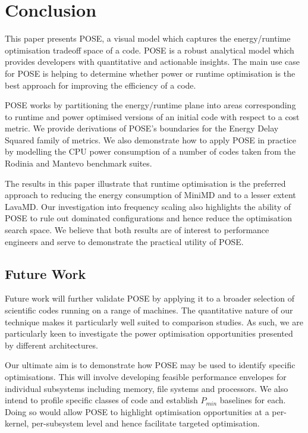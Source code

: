 \section{Conclusion}
\label{sec:conclusion}
This paper presents POSE, a visual model which captures the energy/runtime optimisation tradeoff space of a code.
POSE is a robust analytical model which provides developers with quantitative and actionable insights.
The main use case for POSE is helping to determine whether power or runtime optimisation is the best approach for improving the efficiency of a code.

POSE works by partitioning the energy/runtime plane into areas corresponding to runtime and power optimised versions of an initial code with respect to a cost metric.
We provide derivations of POSE's boundaries for the Energy Delay Squared family of metrics.
We also demonstrate how to apply POSE in practice by modelling the CPU power consumption of a number of codes taken from the Rodinia and Mantevo benchmark suites.  

The results in this paper illustrate that runtime optimisation is the preferred approach to reducing the energy consumption of MiniMD and to a lesser extent LavaMD.
Our investigation into frequency scaling also highlights the ability of POSE to rule out dominated configurations and hence reduce the optimisation search space.
We believe that both results are of interest to performance engineers and serve to demonstrate the practical utility of POSE.

\subsection{Future Work}
Future work will further validate POSE by applying it to a broader selection of scientific codes running on a range of machines.
The quantitative nature of our technique makes it particularly well suited to comparison studies.
As such, we are particularly keen to investigate the power optimisation opportunities presented by different architectures.

Our ultimate aim is to demonstrate how POSE may be used to identify specific optimisations.
This will involve developing feasible performance envelopes for individual subsystems including memory, file systems and processors. 
We also intend to profile specific classes of code and establish $P_{min}$ baselines for each.
Doing so would allow POSE to highlight optimisation opportunities at a per-kernel, per-subsystem level and hence facilitate targeted optimisation.
